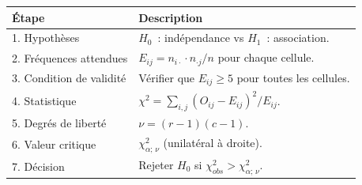 \documentclass[11pt,french]{article}
\begin{document}
\begin{center}
\renewcommand{\arraystretch}{1.5}
\begin{tabular}{p{4cm}p{9cm}}
\toprule
\textbf{Étape} & \textbf{Description} \\
\midrule
1. Hypothèses
  & $H_0$~: indépendance \quad vs \quad $H_1$~: association. \\
2. Fréquences attendues
  & $E_{ij} = n_{i\cdot} \cdot n_{\cdot j} / n$ pour chaque cellule. \\
3. Condition de validité
  & Vérifier que $E_{ij} \geq 5$ pour toutes les cellules. \\
4. Statistique
  & $\chi^2 = \displaystyle\sum_{i,j} (O_{ij} - E_{ij})^2 / E_{ij}$. \\
5. Degrés de liberté
  & $\nu = (r-1)(c-1)$. \\
6. Valeur critique
  & $\chi^2_{\alpha;\,\nu}$ (unilatéral à droite). \\
7. Décision
  & Rejeter $H_0$ si $\chi^2_{obs} > \chi^2_{\alpha;\,\nu}$. \\
\bottomrule
\end{tabular}
\end{center}
\end{document}
